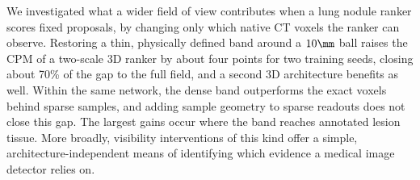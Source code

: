We investigated what a wider field of view contributes when a lung nodule ranker scores fixed proposals, by changing only which native CT voxels the ranker can observe. Restoring a thin, physically defined band around a $10\mm$ ball raises the CPM of a two-scale 3D ranker by about four points for two training seeds, closing about 70\% of the gap to the full field, and a second 3D architecture benefits as well. Within the same network, the dense band outperforms the exact voxels behind sparse samples, and adding sample geometry to sparse readouts does not close this gap. The largest gains occur where the band reaches annotated lesion tissue. More broadly, visibility interventions of this kind offer a simple, architecture-independent means of identifying which evidence a medical image detector relies on.
